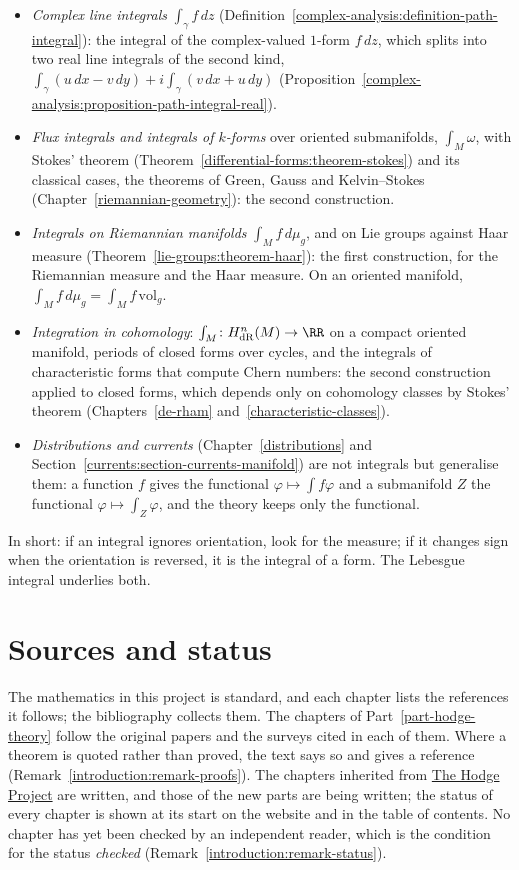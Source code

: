\begin{itemize}
(Proposition~\ref{real-analysis:proposition-second-kind}(3)): choosing the unit tangent $T$ is choosing an orientation.
\item \emph{Complex line integrals} $\int_\gamma f\,dz$ (Definition~\ref{complex-analysis:definition-path-integral}): the integral of the complex-valued $1$-form $f\,dz$, which splits into two real line integrals of the
second kind, $\int_\gamma(u\,dx - v\,dy) + i\int_\gamma(v\,dx + u\,dy)$ (Proposition~\ref{complex-analysis:proposition-path-integral-real}).
\item \emph{Flux integrals and integrals of $k$-forms} over oriented submanifolds, $\int_M\omega$, with Stokes' theorem (Theorem~\ref{differential-forms:theorem-stokes}) and its classical cases, the theorems of Green, Gauss and
Kelvin--Stokes (Chapter~\ref{riemannian-geometry}): the second construction.
\item \emph{Integrals on Riemannian manifolds} $\int_Mf\,d\mu_g$, and on Lie groups against Haar measure (Theorem~\ref{lie-groups:theorem-haar}): the first construction, for the Riemannian measure and the Haar measure. On an
oriented manifold, $\int_Mf\,d\mu_g = \int_Mf\,\mathrm{vol}_g$.
\item \emph{Integration in cohomology}: $\int_M \colon H^n_{\mathrm{dR}}(M) \to \RR$ on a compact oriented manifold, periods of closed forms over cycles, and the integrals of characteristic forms that compute Chern
numbers: the second construction applied to closed forms, which depends only on cohomology classes by Stokes' theorem (Chapters~\ref{de-rham} and~\ref{characteristic-classes}).
\item \emph{Distributions and currents} (Chapter~\ref{distributions} and Section~\ref{currents:section-currents-manifold}) are not integrals but generalise them: a function $f$ gives the functional $\varphi \mapsto \int f\varphi$
and a submanifold $Z$ the functional $\varphi \mapsto \int_Z\varphi$, and the theory keeps only the functional.
\end{itemize}
In short: if an integral ignores orientation, look for the measure; if it changes sign when the orientation is reversed, it is the integral of a form. The Lebesgue integral underlies both.

\section{Sources and status}\label{introduction:section-sources}

The mathematics in this project is standard, and each chapter lists the
references it follows; the bibliography collects them. The chapters of
Part~\ref{part-hodge-theory} follow the original papers and the surveys cited in
each of them. Where a theorem is quoted
rather than proved, the text says so and gives a reference
(Remark~\ref{introduction:remark-proofs}). The chapters inherited from
\href{https://lufranovittorio.github.io/Appunti_Matematica/}{The Hodge Project} are written, and those of the new parts are being written; the
status of every chapter is shown at its start on the website and in the table
of contents. No chapter has yet been checked by an independent reader, which is
the condition for the status \emph{checked}
(Remark~\ref{introduction:remark-status}).

